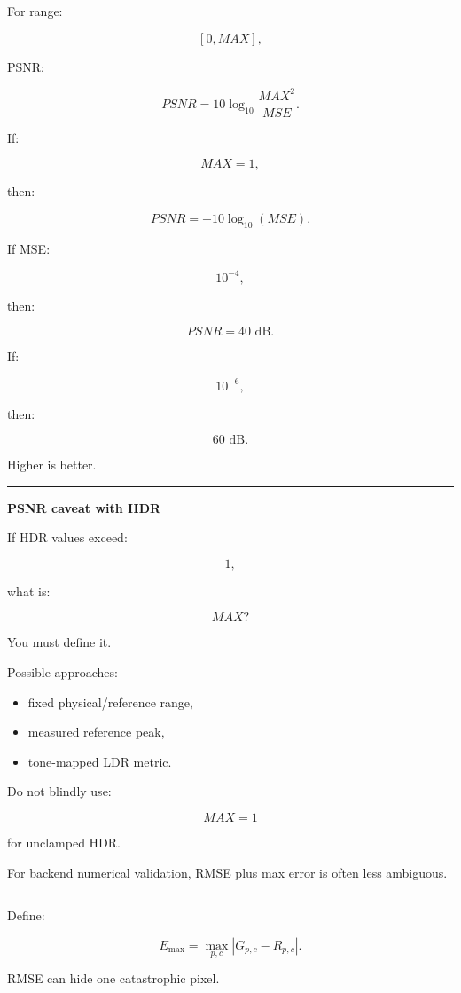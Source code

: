 For range:

\[
[0,MAX],
\]

PSNR:

\[
\boxed{
PSNR
=
10\log_{10}
\frac{MAX^2}{MSE}.
}
\]

If:

\[
MAX=1,
\]

then:

\[
PSNR
=
-10\log_{10}(MSE).
\]

If MSE:

\[
10^{-4},
\]

then:

\[
PSNR=40\text{ dB}.
\]

If:

\[
10^{-6},
\]

then:

\[
60\text{ dB}.
\]

Higher is better.

\begin{center}\rule{0.5\linewidth}{0.5pt}\end{center}

\textbf{PSNR caveat with HDR}

If HDR values exceed:

\[
1,
\]

what is:

\[
MAX?
\]

You must define it.

Possible approaches:

\begin{itemize}
\tightlist
\item
  fixed physical/reference range,
\item
  measured reference peak,
\item
  tone-mapped LDR metric.
\end{itemize}

Do not blindly use:

\[
MAX=1
\]

for unclamped HDR.

For backend numerical validation, RMSE plus max error is often less ambiguous.

\begin{center}\rule{0.5\linewidth}{0.5pt}\end{center}

Define:

\[
\boxed{
E_{\max}
=
\max_{p,c}
|G_{p,c}-R_{p,c}|.
}
\]

RMSE can hide one catastrophic pixel.

